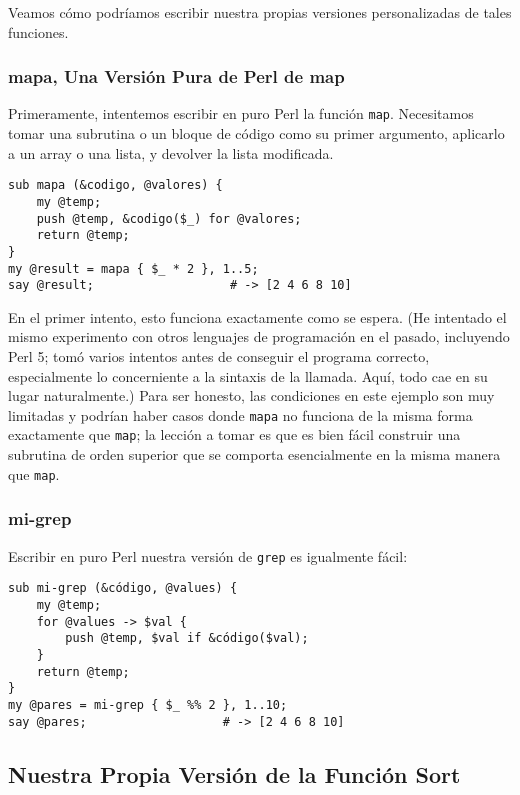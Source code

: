 Veamos cómo podríamos escribir nuestra propias versiones
personalizadas de tales funciones.

\subsubsection{mapa, Una Versión Pura de Perl de map}

Primeramente, intentemos escribir en puro Perl la función {\tt map}.
Necesitamos tomar una subrutina o un bloque de código
como su primer argumento, aplicarlo a un array o una lista,
y devolver la lista modificada.

\begin{verbatim}
sub mapa (&codigo, @valores) { 
    my @temp;
    push @temp, &codigo($_) for @valores;
    return @temp;
}
my @result = mapa { $_ * 2 }, 1..5; 
say @result;                   # -> [2 4 6 8 10]
\end{verbatim}

En el primer intento, esto funciona exactamente como se espera.
(He intentado el mismo experimento con otros lenguajes de 
programación en el pasado, incluyendo Perl 5; tomó
varios intentos antes de conseguir el programa correcto, 
especialmente lo concerniente a la sintaxis de la llamada.
Aquí, todo cae en su lugar naturalmente.) Para ser honesto, 
las condiciones en este ejemplo son muy limitadas y podrían
haber casos donde {\tt mapa} no funciona de la misma forma
exactamente que {\tt map}; la lección a tomar es que es bien
fácil construir una subrutina de orden superior que se comporta 
esencialmente en la misma manera que {\tt map}.

\subsubsection{mi-grep}

Escribir en puro Perl nuestra versión de {\tt grep} es igualmente
fácil:
\begin{verbatim}
sub mi-grep (&código, @values) { 
    my @temp;
    for @values -> $val {
        push @temp, $val if &código($val);
    }
    return @temp;
}
my @pares = mi-grep { $_ %% 2 }, 1..10; 
say @pares;                   # -> [2 4 6 8 10]
\end{verbatim}

\subsection{Nuestra Propia Versión de la Función Sort}
\label{combsort}

